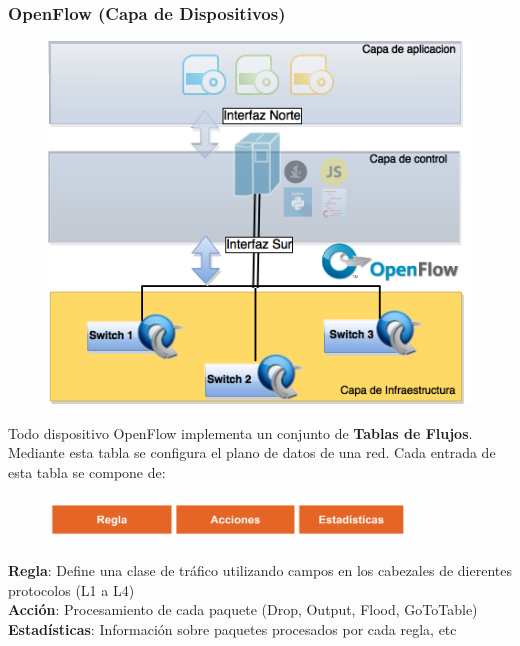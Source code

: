 \documentclass{beamer}
\begin{document}
\begin{frame}
\frametitle{OpenFlow (Capa de Dispositivos)} 
\begin{minipage}{0.40\textwidth}
	\begin{figure}[H]
		\centering
		\includegraphics[width=1.0\textwidth]{imagenes/openflowDevices.png}
	\end{figure}

\end{minipage}
\hfill
\begin{minipage}{0.58\textwidth}
Todo dispositivo OpenFlow implementa un conjunto de \textbf{Tablas de Flujos}. Mediante esta tabla se configura el plano de datos de una red. Cada entrada de esta tabla se compone de:

	\begin{figure}[H]
		\centering
		\includegraphics[width=0.85\textwidth]{imagenes/OpenFlow.png}
	\end{figure}
	
	\textbf{Regla}: Define una clase de tr\'afico utilizando campos en los cabezales de dierentes protocolos (L1 a L4)\\
	\textbf{Acci\'on}: Procesamiento de cada paquete (Drop, Output, Flood, GoToTable)\\
	\textbf{Estad\'isticas}: Informaci\'on sobre paquetes procesados por cada regla, etc
\end{minipage}

\end{frame}
\end{document}
